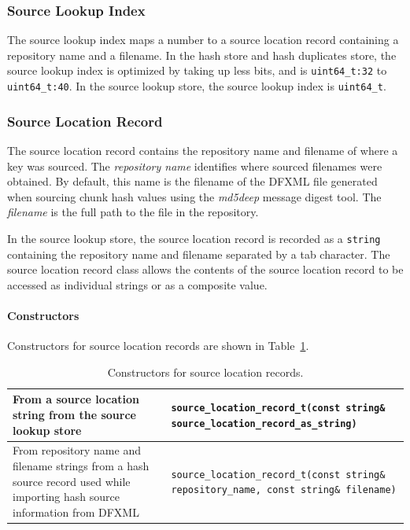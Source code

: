 \documentclass[12pt,twoside]{article}
\newcommand{\mdd}{\emph{md5deep}\xspace}
\begin{document}
\subsubsection{Source Lookup Index}
The source lookup index maps a number to a source location record
containing a repository name and a filename.
In the hash store and hash duplicates store, the source lookup index is optimized by taking up less bits,
and is \texttt{uint64\_t:32} to \texttt{uint64\_t:40}.
In the source lookup store, the source lookup index is \texttt{uint64\_t}.

\subsubsection{Source Location Record}
The source location record contains the repository name
and filename of where a key was sourced.
The \emph{repository name} identifies where sourced filenames were obtained.
By default, this name is the filename of the DFXML file generated
when sourcing chunk hash values using the \mdd message digest tool.
The \emph{filename} is the full path to the file in the repository.

In the source lookup store,
the source location record is recorded as a \texttt{string}
containing the repository name and filename separated by a tab character.
The source location record class allows the contents of the source location record
to be accessed as individual strings or as a composite value.
\paragraph{Constructors}
Constructors for source location records
are shown in Table~\ref{source-location-constructors}.
\begin{table}[h]
\center
\begin{tabular}{|p{2in}|p{4in}|}
\hline
From a source location string from the source lookup store & \texttt{source\_location\_record\_t(const string\& source\_location\_record\_as\_string)} \\
\hline
From repository name and filename strings from a hash source record used while importing hash source information from DFXML & \texttt{source\_location\_record\_t(const string\& repository\_name, const string\& filename)} \\
\hline
\end{tabular}
\caption{Constructors for source location records.\label{source-location-constructors}}
\end{table}
\end{document}

